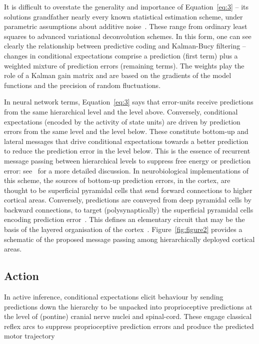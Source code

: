 \documentclass[a4paper]{article} %
\begin{document}
It is difficult to overstate the generality and importance of Equation~\ref{eq:3} -- its solutions grandfather nearly every known statistical
estimation scheme, under parametric assumptions about additive noise~\citep{Friston08b}. These range from ordinary least squares to advanced
variational deconvolution schemes. In this form, one can see clearly the
relationship between predictive coding and Kalman-Bucy filtering --
changes in conditional expectations comprise a prediction (first term)
plus a weighted mixture of prediction errors (remaining terms). The
weights play the role of a Kalman gain matrix and are based on the
gradients of the model functions and the precision of random
fluctuations.

In neural network terms, Equation~\ref{eq:3} says that error-units receive
predictions from the same hierarchical level and the level above.
Conversely, conditional expectations (encoded by the activity of state
units) are driven by prediction errors from the same level and the level
below. These constitute bottom-up and lateral messages that drive
conditional expectations towards a better prediction to reduce the
prediction error in the level below. This is the essence of recurrent
message passing between hierarchical levels to suppress free energy or
prediction error: see~\citep{Friston09b} for a more detailed
discussion. In neurobiological implementations of this scheme, the
sources of bottom-up prediction errors, in the cortex, are thought to be
superficial pyramidal cells that send forward connections to higher
cortical areas. Conversely, predictions are conveyed from deep pyramidal
cells by backward connections, to target (polysynaptically) the
superficial pyramidal cells encoding prediction error~\citep{Friston09b,Mumford92}. This defines an elementary circuit that may
be the basis of the layered organisation of the cortex~\citep{Bastos12}. Figure~\ref{fig:figure2} provides a schematic of the proposed message passing
among hierarchically deployed cortical areas.

\subsection{Action}
\label{sec:action}
In active inference, conditional expectations elicit behaviour by
sending predictions down the hierarchy to be unpacked into
proprioceptive predictions at the level of (pontine) cranial nerve
nuclei and spinal-cord. These engage classical reflex arcs to suppress
proprioceptive prediction errors and produce the predicted motor
trajectory
\end{document}
